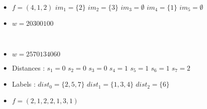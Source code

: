 \begin{example}[$a < b : a = 3, b = 5,
    \mathcal{PF}_{a,b} \to \mathcal{LR}_{a,b}$]
    ~\
    \begin{itemize}
        \item $f = (4, 1, 2)$
            \subitem $im_1 = \{2\}$
            \hspace{16mm} $im_2 = \{3\}$
            \hspace{24mm} $im_3 = \emptyset$
            \subitem $im_4 = \{1\}$
            \hspace{16mm} $im_5 = \emptyset$
        \item $w = 20300100$
    \end{itemize}
    
\end{example}

\begin{example}[$a > b : a = 7, b = 3,
        \mathcal{LR}_{a,b} \to \mathcal{PF}_{a,b}$]
    ~\
    \begin{itemize}
        \item $w = 2570134060$
    \end{itemize}
    
    \begin{itemize}
        \item Distances :
            \subitem $s_1 = 0$
            \hspace{2cm} $s_2 = 0$
            \hspace{2cm} $s_3 = 0$
            \subitem $s_4 = 1$
            \hspace{2cm} $s_5 = 1$
            \hspace{2cm} $s_6 = 1$
            \subitem $s_7 = 2$
        \item Labels :
            \subitem $dist_0 = \{2, 5, 7\}$
            \hspace{2cm} $dist_1 = \{1, 3, 4\}$
            \hspace{2cm} $dist_2 = \{6\}$
        \item $f = (2, 1, 2, 2, 1, 3, 1)$
    \end{itemize}
\end{example}


